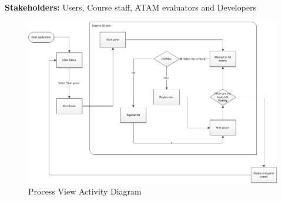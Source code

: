     \noindent\textbf{Stakeholders:} Users, Course staff, ATAM evaluators and Developers 
    
    \begin{figure}[h]
        \includegraphics[angle=90, scale=0.8]{ProcessLayer.png}
        \caption{Process View Activity Diagram}
        \label{fig:DevelopmentView}
    \end{figure}